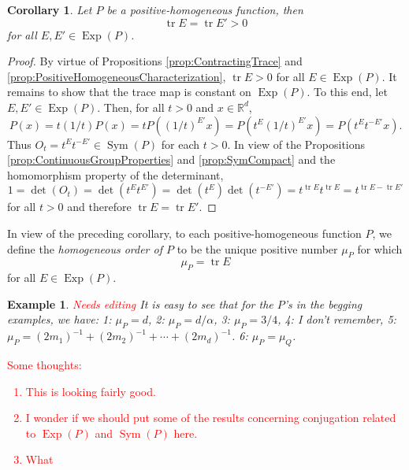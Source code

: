 \documentclass[11pt]{article}
\theoremstyle{theorem}
\newtheorem{corollary}[theorem]{Corollary}
\newtheorem{example}{Example}
\newcommand\Sym{\operatorname{Sym}}
\newcommand\Exp{\operatorname{Exp}}
\newcommand\tr{\operatorname{tr}}
\renewcommand\det{\operatorname{det}}
\begin{document}
\begin{corollary}
Let $P$ be a positive-homogeneous function, then
\begin{equation*}
\tr E=\tr E'>0
\end{equation*}
for all $E,E'\in\Exp(P)$.
\end{corollary}
\begin{proof}
By virtue of Propositions \ref{prop:ContractingTrace} and \ref{prop:PositiveHomogeneousCharacterization}, $\tr E>0$ for all $E\in\Exp(P)$. It remains to show that the trace map is constant on $\Exp(P)$. To this end, let $E,E'\in\Exp(P)$. Then, for all $t>0$ and $x\in\mathbb{R}^d$,
\begin{equation*}
P(x)=t(1/t)P(x)=tP((1/t)^{E'}x)=P(t^E(1/t)^{E'}x)=P(t^{E}t^{-E'}x).
\end{equation*}
Thus $O_t=t^{E}t^{-E'}\in\Sym(P)$ for each $t>0$. In view of the Propositions \ref{prop:ContinuousGroupProperties} and \ref{prop:SymCompact} and the homomorphism property of the determinant,
\begin{equation*}
1=\det(O_t)=\det(t^{E}t^{E'})=\det(t^{E})\det(t^{-E'})=t^{\tr E}t^{\tr E}=t^{\tr E-\tr E'}
\end{equation*}
for all $t>0$ and therefore $\tr E=\tr E'$.
\end{proof}

\noindent In view of the preceding corollary, to each positive-homogeneous function $P$, we define the \textit{homogeneous order of $P$} to be the unique positive number $\mu_P$ for which
\begin{equation*}
\mu_P=\tr E
\end{equation*}
for all $E\in\Exp(P)$. 

\begin{example}\textcolor{red}{Needs editing}
It is easy to see that for the $P$'s in the begging examples, we have: 1: $\mu_P=d$, 2: $\mu_P=d/\alpha$, 3: $\mu_P=3/4$, 4: I don't remember, 5: $\mu_P=(2m_1)^{-1}+(2m_2)^{-1}+\cdots+(2m_d)^{-1}$. 6: $\mu_P=\mu_Q$.
\end{example}


\textcolor{red}{Some thoughts:
\begin{enumerate}
\item This is looking fairly good. 
\item I wonder if we should put some of the results concerning conjugation related to $\Exp(P)$ and $\Sym(P)$ here.
\item What 
\end{enumerate}}
\end{document}
